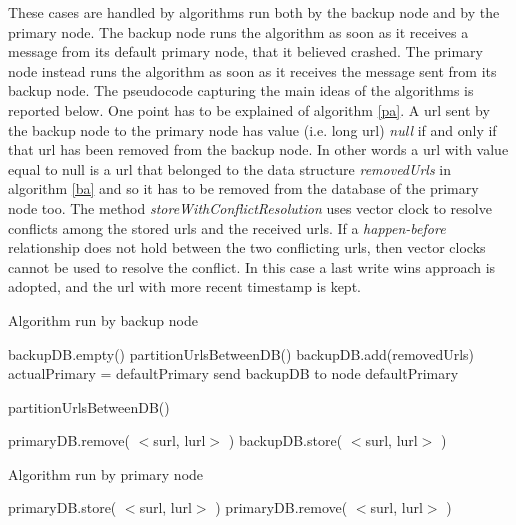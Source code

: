 \documentclass{article}
\begin{document}
These cases are handled by algorithms run both by the backup node and by the primary node. The backup node runs the algorithm as soon as it receives a message from its default primary node, that it believed crashed. The primary node instead runs the algorithm as soon as it receives the message sent from its backup node. The pseudocode capturing the main ideas of the algorithms is reported below. One point has to be explained of algorithm \ref{pa}. A url sent by the backup node to the primary node has value (i.e. long url) \textit{null} if and only if that url has been removed from the backup node. In other words a url with value equal to null is a url that belonged to the data structure \textit{removedUrls} in algorithm \ref{ba} and so it has to be removed from the database of the primary node too. The method \textit{storeWithConflictResolution} uses vector clock to resolve conflicts among the stored urls and the received urls. If a \textit{happen-before} relationship does not hold between the two conflicting urls, then vector clocks cannot be used to resolve the conflict. In this case a last write wins approach is adopted, and the url with more recent timestamp is kept.

\begin{algorithm}
\caption{Algorithm run by backup node}\label{ba}
\begin{algorithmic}[1]
\State backupDB.empty()
\State partitionUrlsBetweenDB()
\State backupDB.add(removedUrls)
\State actualPrimary = defaultPrimary
\State send backupDB to node defaultPrimary
\EndIf 
\end{algorithmic}
\end{algorithm}


\begin{algorithm}
\caption{partitionUrlsBetweenDB()}\label{purls}
\begin{algorithmic}[1]
\State primaryDB.remove( $<$surl, lurl$>$ )
\State backupDB.store( $<$surl, lurl$>$ )
\EndIf 
\EndFor
\end{algorithmic}
\end{algorithm}

\begin{algorithm}
\caption{Algorithm run by primary node}\label{pa}
\begin{algorithmic}[1]
 
\State primaryDB.store( $<$surl, lurl$>$ )
\Else 
{} 
\State primaryDB.remove( $<$surl, lurl$>$ )
 
\EndIf
\EndIf 
\EndFor
\end{algorithmic}
\end{algorithm}
\end{document}

